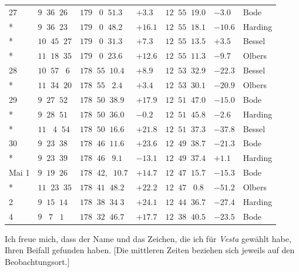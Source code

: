 \begin{longtable}{l|l|l|l|l|l|l}
27      & $9\;\;36\;\;26$ & $179\;\;\;0\;\;51.3$ & $+3.3$ & $12\;\;55\;\;19.0$ & $-3.0$ & Bode \\*
        & $9\;\;36\;\;23$ & $179\;\;\;0\;\;48.2$ & $+16.1$ & $12\;\;55\;\;18.1$ & $-10.6$ & Harding \\*
        & $10\;\;45\;\;27$ & $179\;\;\;0\;\;31.3$ & $+7.3$ & $12\;\;55\;\;13.5$ & $+3.5$ & Bessel \\*
        & $11\;\;18\;\;35$ & $179\;\;\;0\;\;23.6$ & $+12.6$ & $12\;\;55\;\;11.3$ & $-9.7$ & Olbers \\
28      & $10\;\;57\;\;\;6$ & $178\;\;55\;\;10.4$ & $+8.9$ & $12\;\;53\;\;32.9$ & $-22.3$ & Bessel \\*
        & $11\;\;34\;\;20$ & $178\;\;55\;\;\;2.4$ & $+3.4$ & $12\;\;53\;\;30.1$ & $-20.9$ & Olbers \\
29      & $9\;\;27\;\;52$ & $178\;\;50\;\;38.9$ & $+17.9$ & $12\;\;51\;\;47.0$ & $-15.0$ & Bode \\*
        & $9\;\;28\;\;51$ & $178\;\;50\;\;36.0$ & $-0.2$ & $12\;\;51\;\;45.8$ & $-2.6$ & Harding \\*
        & $11\;\;\;4\;\;54$ & $178\;\;50\;\;16.6$ & $+21.8$ & $12\;\;51\;\;37.3$ & $-37.8$ & Bessel \\
30      & $9\;\;23\;\;38$ & $178\;\;46\;\;11.6$ & $+23.6$ & $12\;\;49\;\;38.7$ & $-21.3$ & Bode \\*
        & $9\;\;23\;\;39$ & $178\;\;46\;\;\;9.1$ & $-13.1$ & $12\;\;49\;\;37.4$ & $+1.1$ & Harding \\
Mai 1   & $9\;\;19\;\;26$ & $178\;\;42,\;\;10.7$ & $+14.7$ & $12\;\;47\;\;15.7$ & $-15.3$ & Bode \\*
        & $11\;\;23\;\;35$ & $178\;\;41\;\;48.2$ & $+22.2$ & $12\;\;47\;\;\;0.8$ & $-51.2$ & Olbers \\
2       & $9\;\;15\;\;14$ & $178\;\;38\;\;34\;3$ & $+24.1$ & $12\;\;44\;\;36.7$ & $-27.4$ & Harding \\
4       & $9\;\;\;7\;\;\;1$ & $178\;\;32\;\;46.7$ & $+17.7$ & $12\;\;38\;\;40.5$ & $-23.5$ & Bode \\
\end{longtable}\endgroup

\par\indent Ich freue mich, dass der Name und das Zeichen, die ich für \emph{Vesta} gewählt habe, Ihren Beifall gefunden haben. [Die mittleren Zeiten beziehen sich jeweils auf den Beobachtungsort.]
